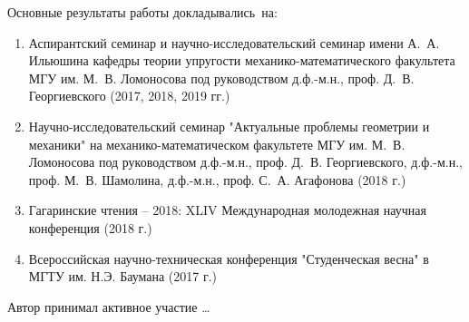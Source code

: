 {\probation}
Основные результаты работы докладывались~на:
\begin{enumerate}[beginpenalty=10000] %
    \item Аспирантский семинар и научно-исследовательский семинар имени А.~А. Ильюшина кафедры теории упругости механико-математического факультета МГУ им. М.~В. Ломоносова под руководством д.ф.-м.н., проф. Д.~В. Георгиевского (2017, 2018, 2019 гг.)
    \item Научно-исследовательский семинар "Актуальные проблемы геометрии и механики" на механико-математическом факультете МГУ им. М.~В. Ломоносова под руководством д.ф.-м.н., проф. Д.~В. Георгиевского, д.ф.-м.н., проф. М.~В. Шамолина, д.ф.-м.н., проф. С.~А. Агафонова (2018 г.)
    \item Гагаринские чтения -- 2018: XLIV Международная молодежная научная конференция (2018 г.)
    \item Всероссийская научно-техническая конференция "Студенческая весна" в МГТУ им. Н.Э. Баумана (2017 г.)
\end{enumerate}

{\contribution} Автор принимал активное участие \ldots

